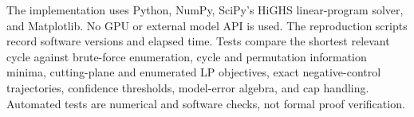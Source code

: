 The implementation uses Python, NumPy, SciPy's HiGHS linear-program solver, and Matplotlib. No GPU or external model API is used. The reproduction scripts record software versions and elapsed time. Tests compare the shortest relevant cycle against brute-force enumeration, cycle and permutation information minima, cutting-plane and enumerated LP objectives, exact negative-control trajectories, confidence thresholds, model-error algebra, and cap handling. Automated tests are numerical and software checks, not formal proof verification.
